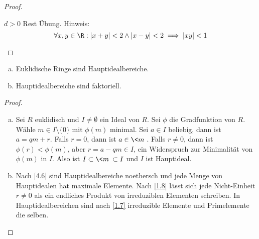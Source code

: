 \begin{st}
\begin{proof}
\begin{segnb}{$d > 0$}
			Rest Übung.
			Hinweis:
			\[
				\forall x,y \in \R:  |x+y| < 2 \land |x-y| < 2 \implies |xy| < 1
			\]
		\end{segnb}
	\end{proof}
\end{st}

\begin{st} \label{4.10}
	\begin{enumerate}[a)]
		\item
			Euklidische Ringe sind Hauptidealbereiche.
		\item
			Hauptidealbereiche sind faktoriell.
	\end{enumerate}
	\begin{proof}
		\begin{enumerate}[a)]
			\item
				Sei $R$ euklidisch und $I \neq \emptyset$ ein Ideal von $R$.
				Sei $\phi$ die Gradfunktion von $R$.
				Wähle $m \in I \setminus \{0\}$ mit $\phi(m)$ minimal.
				Sei $a \in I$ beliebig, dann ist $a = qm + r$.
				Falls $r = 0$, dann ist $a \in \<m\>$.
				Falls $r \neq 0$, dann ist $\phi(r) < \phi(m)$, aber $r = a - qm \in I$, ein Widerspruch zur Minimalität von $\phi(m)$ in $I$.
				Also ist $I \subset \<m\> \subset I$ und $I$ ist Hauptideal.
			\item
				Nach \ref{4.6} sind Hauptidealbereiche noethersch und jede Menge von Hauptidealen hat maximale Elemente.
				Nach \ref{1.8} lässt sich jede Nicht-Einheit $r \neq 0$ als ein endliches Produkt von irreduziblen Elementen schreiben.
				In Hauptidealbereichen sind nach \ref{1.7} irreduzible Elemente und Primelemente die selben.
		\end{enumerate}
	\end{proof}
\end{st}

